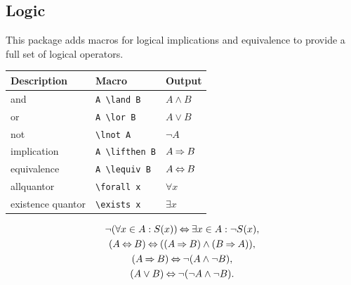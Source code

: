 \documentclass[DIV=13]{scrartcl}
\begin{document}
\subsection{Logic}
This package adds macros for logical implications and equivalence to provide
a full set of logical operators.
\begin{center}
  \begin{tabular}{lll}
    \toprule
    \textbf{Description} & \textbf{Macro}      & \textbf{Output} \\
    \midrule
    and                  & \verb|A \land B|    & $A \land B$     \\
    or                   & \verb|A \lor B|     & $A \lor B$      \\
    not                  & \verb|\lnot A|      & $\lnot A$       \\
    implication          & \verb|A \lifthen B| & $A \mathbin{\Rightarrow} B$  \\
    equivalence          & \verb|A \lequiv B|  & $A \mathbin{\Leftrightarrow} B$   \\
    \midrule
    allquantor           & \verb|\forall x|    & $\forall x$     \\
    existence quantor    & \verb|\exists x|    & $\exists x$     \\
    \bottomrule
  \end{tabular}
\end{center}
\begin{gather}
  \lnot(\forall x \in A : S(x)) \mathbin{\Leftrightarrow} \exists x \in A : \lnot S(x), \\
  (A \mathbin{\Leftrightarrow} B) \mathbin{\Leftrightarrow} ((A \mathbin{\Rightarrow} B) \land (B \mathbin{\Rightarrow} A)), \\
  (A \mathbin{\Rightarrow} B) \mathbin{\Leftrightarrow} \lnot(A \land \lnot B), \\
  (A \lor B) \mathbin{\Leftrightarrow} \lnot(\lnot A \land \lnot B).
\end{gather}
\end{document}
